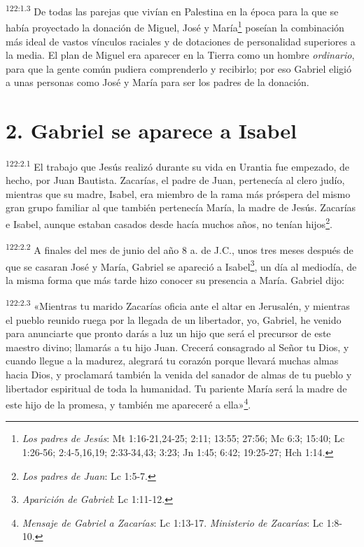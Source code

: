 \par 
\textsuperscript{122:1.3} De todas las parejas que vivían en Palestina en la época para la que se había proyectado la donación de Miguel, José y María\footnote{\textit{Los padres de Jesús}: Mt 1:16-21,24-25; 2:11; 13:55; 27:56; Mc 6:3; 15:40; Lc 1:26-56; 2:4-5,16,19; 2:33-34,43; 3:23; Jn 1:45; 6:42; 19:25-27; Hch 1:14.} poseían la combinación más ideal de vastos vínculos raciales y de dotaciones de personalidad superiores a la media. El plan de Miguel era aparecer en la Tierra como un hombre \textit{ordinario}, para que la gente común pudiera comprenderlo y recibirlo; por eso Gabriel eligió a unas personas como José y María para ser los padres de la donación.

\section*{2. Gabriel se aparece a Isabel}
\par 
\textsuperscript{122:2.1} El trabajo que Jesús realizó durante su vida en Urantia fue empezado, de hecho, por Juan Bautista. Zacarías, el padre de Juan, pertenecía al clero judío, mientras que su madre, Isabel, era miembro de la rama más próspera del mismo gran grupo familiar al que también pertenecía María, la madre de Jesús. Zacarías e Isabel, aunque estaban casados desde hacía muchos años, no tenían hijos\footnote{\textit{Los padres de Juan}: Lc 1:5-7.}.

\par 
\textsuperscript{122:2.2} A finales del mes de junio del año 8 a. de J.C., unos tres meses después de que se casaran José y María, Gabriel se apareció a Isabel\footnote{\textit{Aparición de Gabriel}: Lc 1:11-12.}, un día al mediodía, de la misma forma que más tarde hizo conocer su presencia a María. Gabriel dijo:

\par 
\textsuperscript{122:2.3} «Mientras tu marido Zacarías oficia ante el altar en Jerusalén, y mientras el pueblo reunido ruega por la llegada de un libertador, yo, Gabriel, he venido para anunciarte que pronto darás a luz un hijo que será el precursor de este maestro divino; llamarás a tu hijo Juan. Crecerá consagrado al Señor tu Dios, y cuando llegue a la madurez, alegrará tu corazón porque llevará muchas almas hacia Dios, y proclamará también la venida del sanador de almas de tu pueblo y libertador espiritual de toda la humanidad. Tu pariente María será la madre de este hijo de la promesa, y también me apareceré a ella»\footnote{\textit{Mensaje de Gabriel a Zacarías}: Lc 1:13-17. \textit{Ministerio de Zacarías}: Lc 1:8-10.}.

